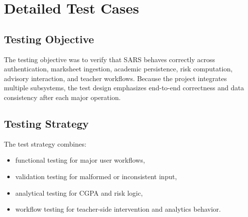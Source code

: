 \chapter{Detailed Test Cases}

\section{Testing Objective}
The testing objective was to verify that SARS behaves correctly across authentication, marksheet ingestion, academic persistence, risk computation, advisory interaction, and teacher workflows. Because the project integrates multiple subsystems, the test design emphasizes end-to-end correctness and data consistency after each major operation.

\section{Testing Strategy}
The test strategy combines:
\begin{itemize}[leftmargin=*]
\item functional testing for major user workflows,
\item validation testing for malformed or inconsistent input,
\item analytical testing for CGPA and risk logic,
\item workflow testing for teacher-side intervention and analytics behavior.
\end{itemize}

